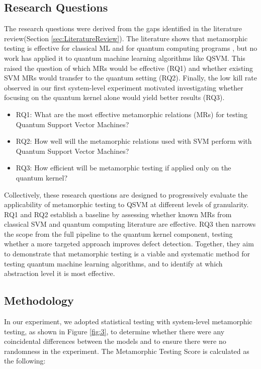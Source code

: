 \documentclass[12pt,a4paper]{article}
\begin{document}
	\subsection{Research Questions}
	
		The research questions were derived from the gaps identified in the literature review(Section \ref{sec:LiteratureReview}). The literature shows that metamorphic testing is effective for classical ML \cite{Dwarakanath2018, ssantos2020} and for quantum computing programs \cite{Paltenghi2023, gracia2024}, but no work has applied it to quantum machine learning algorithms like QSVM. This raised the question of which MRs would be effective (RQ1) and whether existing SVM MRs would transfer to the quantum setting (RQ2). Finally, the low kill rate observed in our first system-level experiment motivated investigating whether focusing on the quantum kernel alone would yield better results (RQ3).
	

	\begin{itemize}
		\item RQ1: What are the most effective metamorphic relations (MRs) for testing Quantum Support Vector Machines?
		\item RQ2: How well will the metamorphic relations used with SVM perform with Quantum Support Vector Machines?
		\item RQ3: How efficient will be metamorphic testing if applied only on the quantum kernel?
	\end{itemize}
	
	Collectively, these research questions are designed to progressively evaluate the
	applicability of metamorphic testing to QSVM at different levels of granularity.
	RQ1 and RQ2 establish a baseline by assessing whether known MRs from classical
	SVM and quantum computing literature are effective. RQ3 then narrows the
	scope from the full pipeline to the quantum kernel component, testing whether a
	more targeted approach improves defect detection. Together, they aim to demonstrate
	that metamorphic testing is a viable and systematic method for testing quantum
	machine learning algorithms, and to identify at which abstraction level it is most
	effective.
	
	\subsection{Methodology}
	
	In our experiment, we adopted statistical testing with system-level metamorphic testing, as shown in Figure \ref{fig:3}, to determine whether there were any coincidental differences between the models and to ensure there were no randomness \cite{10.1145/1985793.1985795} in the experiment. The Metamorphic Testing Score is calculated as the following:
	
\end{document}
